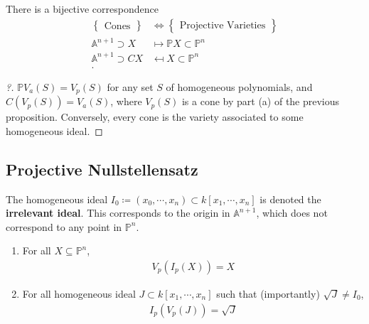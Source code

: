 \begin{lemma}[?]

There is a bijective correspondence
\begin{align*}  
\left\{{\substack{\text{Cones}}}\right\} 
&\iff
\left\{{\substack{\text{Projective Varieties}}}\right\} \\
{\mathbb{A}}^{n+1} \supset X &\mapsto {\mathbb{P}}X\subset {\mathbb{P}}^n \\
{\mathbb{A}}^{n+1} \supset CX &\mapsfrom X\subset {\mathbb{P}}^n \\
.\end{align*}

\end{lemma}

\begin{proof}[?]

\({\mathbb{P}}V_a(S) = V_p(S)\) for any set \(S\) of homogeneous
polynomials, and \(C(V_p(S)) = V_a(S)\), where \(V_p(S)\) is a cone by
part (a) of the previous proposition. Conversely, every cone is the
variety associated to some homogeneous ideal.

\end{proof}

\hypertarget{projective-nullstellensatz-1}{%
\subsection{Projective
Nullstellensatz}\label{projective-nullstellensatz-1}}

\begin{definition}

The homogeneous ideal
\(I_0 \coloneqq(x_0, \cdots, x_n) \subset k[x_1, \cdots, x_{n}]\) is
denoted the \textbf{irrelevant ideal}. This corresponds to the origin in
\({\mathbb{A}}^{n+1}\), which does not correspond to any point in
\({\mathbb{P}}^n\).

\end{definition}

\begin{proposition}

\envlist

\begin{enumerate}
\def\labelenumi{\alph{enumi}.}
\item
  For all \(X\subseteq {\mathbb{P}}^n\),
  \begin{align*}
  V_p(I_p(X)) = X
  \end{align*}
\item
  For all homogeneous ideal \(J\subset k[x_1, \cdots, x_{n}]\) such that
  (importantly) \(\sqrt{J} \neq I_0\),
  \begin{align*}
  I_p(V_p(J)) = \sqrt J
  \end{align*}
\end{enumerate}

\end{proposition}


